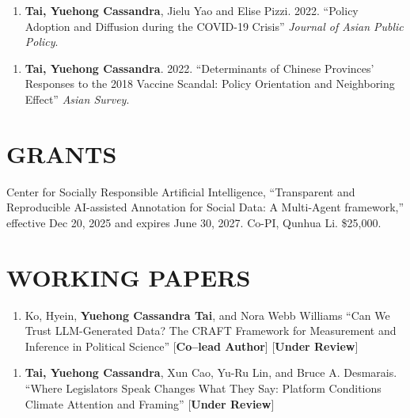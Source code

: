 \documentclass[10.5pt,]{article}
\providecommand{\tightlist}{%
	\setlength{\itemsep}{0pt}\setlength{\parskip}{0pt}}
\renewenvironment{itemize}{
	\begin{list}{}{
			\setlength{\leftmargin}{1.5em}
		}
	}{
	\end{list}
}
\begin{document}
\begin{itemize}
  \begin{itemize}
  \tightlist
  \item
    \begin{enumerate}
    \def\labelenumi{\arabic{enumi}.}
    \setcounter{enumi}{1}
    \tightlist
    \item
      \textbf{Tai, Yuehong Cassandra}, Jielu Yao and Elise Pizzi. 2022.
      ``Policy Adoption and Diffusion during the COVID-19 Crisis''
      \emph{Journal of Asian Public Policy}.
    \end{enumerate}
  \item
    \begin{enumerate}
    \def\labelenumi{\arabic{enumi}.}
    \tightlist
    \item
      \textbf{Tai, Yuehong Cassandra}. 2022. ``Determinants of Chinese
      Provinces' Responses to the 2018 Vaccine Scandal: Policy
      Orientation and Neighboring Effect'' \emph{Asian Survey}.
    \end{enumerate}
  \end{itemize}
\end{itemize}

\section{GRANTS}\label{grants}

\begin{itemize}
\tightlist
\item
  Center for Socially Responsible Artificial Intelligence, ``Transparent
  and Reproducible AI-assisted Annotation for Social Data: A Multi-Agent
  framework,'' effective Dec 20, 2025 and expires June 30, 2027. Co-PI,
  Qunhua Li. \$25,000.
\end{itemize}

\section{WORKING PAPERS}\label{working-papers}

\begin{itemize}
\tightlist
\item
  \begin{enumerate}
  \def\labelenumi{\arabic{enumi}.}
  \setcounter{enumi}{1}
  \tightlist
  \item
    Ko, Hyein, \textbf{Yuehong Cassandra Tai}, and Nora Webb Williams
    ``Can We Trust LLM-Generated Data? The CRAFT Framework for
    Measurement and Inference in Political Science'' {[}\textbf{Co--lead
    Author}{]} {[}\textbf{Under Review}{]}
  \end{enumerate}
\item
  \begin{enumerate}
  \def\labelenumi{\arabic{enumi}.}
  \tightlist
  \item
    \textbf{Tai, Yuehong Cassandra}, Xun Cao, Yu-Ru Lin, and Bruce A.
    Desmarais. ``Where Legislators Speak Changes What They Say: Platform
    Conditions Climate Attention and Framing'' {[}\textbf{Under
    Review}{]}
  \end{enumerate}
\end{itemize}
\end{document}
